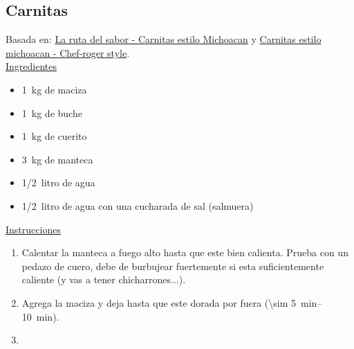 \subsection{Carnitas}

Basada en: \href{https://www.youtube.com/watch?v=RHBXS7Oo1VM}{La ruta del sabor - Carnitas estilo Michoacan} y \href{https://www.youtube.com/watch?v=3Yz4mSFP9G8}{Carnitas estilo michoacan - Chef-roger style}. \\

\underline{Ingredientes}

\begin{itemize}
\item \SI{1}{kg} de maciza
\item \SI{1}{kg} de buche
\item \SI{1}{kg} de cuerito
\item \SI{3}{kg} de manteca
\item \SI{1/2}{litro} de agua
\item \SI{1/2}{litro} de agua con una cucharada de sal (salmuera)
\end{itemize}

\underline{Instrucciones}

\begin{enumerate}
\item Calentar la manteca a fuego alto hasta que este bien calienta. Prueba con un pedazo de cuero, debe de burbujear fuertemente si esta suficientemente caliente (y vas a tener chicharrones...).
\item Agrega la maciza y deja hasta que este dorada por fuera (\SIrange{\sim 5}{10}{min}).
\item 
\end{enumerate}
